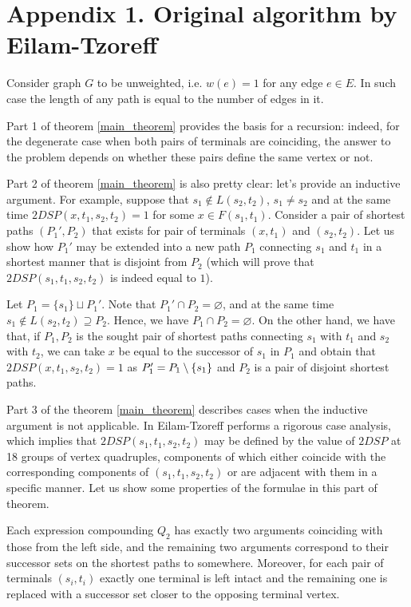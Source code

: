 \section{Appendix 1. Original algorithm by Eilam-Tzoreff}

Consider graph $G$ to be unweighted, i.e. $w(e) = 1$ for any edge $e \in E$. In such case the length of any path is equal to the number of edges in it.

Part 1 of theorem \ref{main_theorem} provides the basis for a recursion: indeed, for the degenerate case when both pairs of terminals are coinciding, the answer to the problem depends on whether these pairs define the same vertex or not.

Part 2 of theorem \ref{main_theorem} is also pretty clear: let's provide an inductive argument. For example, suppose that $s_1 \notin L(s_2, t_2)$, $s_1 \neq s_2$ and at the same time $2DSP(x, t_1, s_2, t_2) = 1$ for some $x \in F(s_1, t_1)$. Consider a pair of shortest paths $(P_1', P_2)$ that exists for pair of terminals $(x, t_1)$ and $(s_2, t_2)$. Let us show how $P_1'$ may be extended into a new path $P_1$ connecting $s_1$ and $t_1$ in a shortest manner that is disjoint from $P_2$ (which will prove that $2DSP(s_1, t_1, s_2, t_2)$ is indeed equal to $1$).

Let $P_1 = \{s_1\} \sqcup P_1'$. Note that $P_1' \cap P_2 = \varnothing$, and at the same time $s_1 \notin L(s_2, t_2) \supseteq P_2$. Hence, we have $P_1 \cap P_2 = \varnothing$. On the other hand, we have that, if $P_1, P_2$ is the sought pair of shortest paths connecting $s_1$ with $t_1$ and $s_2$ with $t_2$, we can take $x$ be equal to the successor of $s_1$ in $P_1$ and obtain that $2DSP(x, t_1, s_2, t_2) = 1$ as $P_1' = P_1 \setminus \{s_1\}$ and $P_2$ is a pair of disjoint shortest paths.

Part 3 of the theorem \ref{main_theorem} describes cases when the inductive argument is not applicable. In \cite{ET} Eilam-Tzoreff performs a rigorous case analysis, which implies that $2DSP(s_1, t_1, s_2, t_2)$  may be defined by the value of $2DSP$ at 18 groups of vertex quadruples, components of which either coincide with the corresponding components of $(s_1, t_1, s_2, t_2)$ or are adjacent with them in a specific manner. Let us show some properties of the formulae in this part of theorem.

\begin{proposition} \label{q2_structure}
Each expression compounding $Q_2$ has exactly two arguments coinciding with those from the left side, and the remaining two arguments correspond to their successor sets on the shortest paths to somewhere. Moreover, for each pair of terminals $(s_i, t_i)$ exactly one terminal is left intact and the remaining one is replaced with a successor set closer to the opposing terminal vertex.
\end{proposition}

